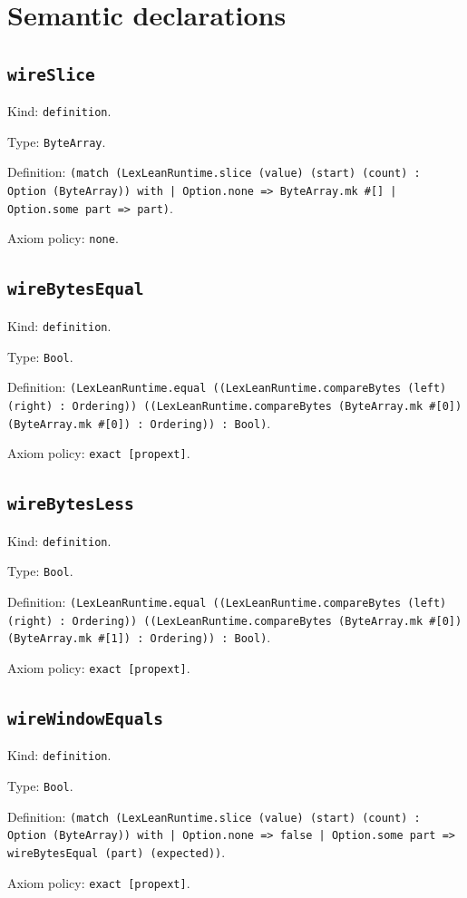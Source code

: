 \documentclass[11pt]{article}
\begin{document}
\section*{Semantic declarations}
\subsection*{\texttt{wireSlice}}
\noindent Kind: \texttt{definition}.\par
\noindent Type: \texttt{ByteArray}.\par
\noindent Definition: \texttt{(match (LexLeanRuntime.slice (value) (start) (count) : Option (ByteArray)) with | Option.none => ByteArray.mk \#[] | Option.some part => part)}.\par
\noindent Axiom policy: \texttt{none}.\par
\subsection*{\texttt{wireBytesEqual}}
\noindent Kind: \texttt{definition}.\par
\noindent Type: \texttt{Bool}.\par
\noindent Definition: \texttt{(LexLeanRuntime.equal ((LexLeanRuntime.compareBytes (left) (right) : Ordering)) ((LexLeanRuntime.compareBytes (ByteArray.mk \#[0]) (ByteArray.mk \#[0]) : Ordering)) : Bool)}.\par
\noindent Axiom policy: \texttt{exact [propext]}.\par
\subsection*{\texttt{wireBytesLess}}
\noindent Kind: \texttt{definition}.\par
\noindent Type: \texttt{Bool}.\par
\noindent Definition: \texttt{(LexLeanRuntime.equal ((LexLeanRuntime.compareBytes (left) (right) : Ordering)) ((LexLeanRuntime.compareBytes (ByteArray.mk \#[0]) (ByteArray.mk \#[1]) : Ordering)) : Bool)}.\par
\noindent Axiom policy: \texttt{exact [propext]}.\par
\subsection*{\texttt{wireWindowEquals}}
\noindent Kind: \texttt{definition}.\par
\noindent Type: \texttt{Bool}.\par
\noindent Definition: \texttt{(match (LexLeanRuntime.slice (value) (start) (count) : Option (ByteArray)) with | Option.none => false | Option.some part => wireBytesEqual (part) (expected))}.\par
\noindent Axiom policy: \texttt{exact [propext]}.\par
\end{document}
